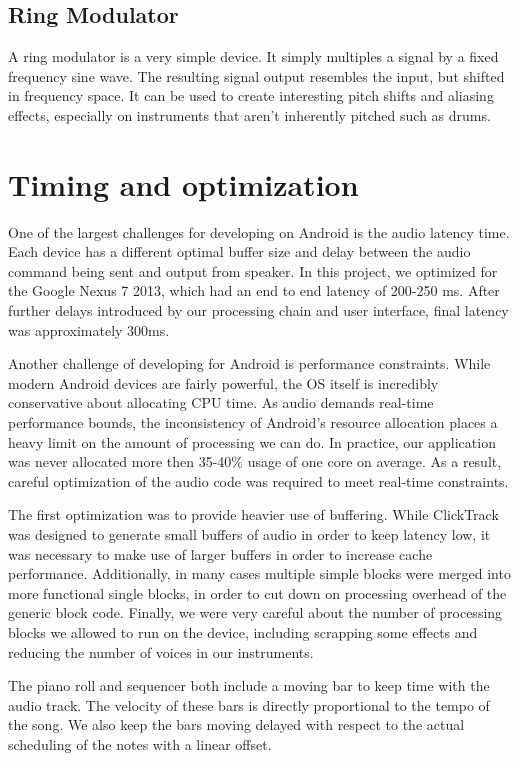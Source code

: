 \documentclass[letterpaper,12pt]{article}
\begin{document}
\subsection{Ring Modulator}

A ring modulator is a very simple device. It simply multiples a signal by a fixed frequency sine wave. The resulting signal output resembles the input, but shifted in frequency space. It can be used to create interesting pitch shifts and aliasing effects, especially on instruments that aren't inherently pitched such as drums.



\section{Timing and optimization}

One of the largest challenges for developing on Android is the audio latency time. Each device has a different optimal buffer size and delay between the audio command being sent and output from speaker. In this project, we optimized for the Google Nexus 7 2013, which had an end to end latency of 200-250 ms. After further delays introduced by our processing chain and user interface, final latency was approximately 300ms.

Another challenge of developing for Android is performance constraints. While modern Android devices are fairly powerful, the OS itself is incredibly conservative about allocating CPU time. As audio demands real-time performance bounds, the inconsistency of Android's resource allocation places a heavy limit on the amount of processing we can do. In practice, our application was never allocated more then 35-40\% usage of one core on average. As a result, careful optimization of the audio code was required to meet real-time constraints.

The first optimization was to provide heavier use of buffering. While ClickTrack was designed to generate small buffers of audio in order to keep latency low, it was necessary to make use of larger buffers in order to increase cache performance. Additionally, in many cases multiple simple blocks were merged into more functional single blocks, in order to cut down on processing overhead of the generic block code. Finally, we were very careful about the number of processing blocks we allowed to run on the device, including scrapping some effects and reducing the number of voices in our instruments.

The piano roll and sequencer both include a moving bar to keep time with the audio track. The velocity of these bars is directly proportional to the tempo of the song. We also keep the bars moving delayed with respect to the actual scheduling of the notes with a linear offset.
\end{document}
